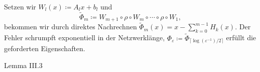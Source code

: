 \documentclass[12pt]{article}
\begin{document}
Setzen wir \(W_l(x) \coloneqq A_l x + b_l\) und 
\[ \tilde{\Phi}_m \coloneqq W_{m+1} \circ \rho \circ W_m \circ \cdots \circ \rho \circ W_1, \]
bekommen wir durch direktes Nachrechnen \(\tilde{\Phi}_m(x) = x - \sum_{k=0}^{m-1} H_k(x)\). 
Der Fehler schrumpft exponentiell in der Netzwerklänge, \(\Phi_\varepsilon \coloneqq \tilde{\Phi}_{\lceil \log(\varepsilon^{-1})/2 \rceil}\) 
erfüllt die geforderten Eigenschaften.

\newpage
{\Large Lemma III.3}
\end{document}
